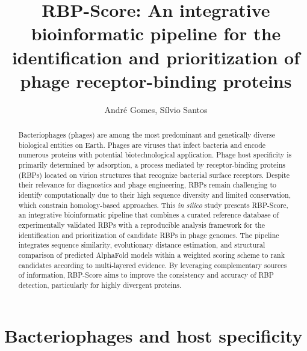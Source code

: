 \documentclass[runningheads]{llncs}
\begin{document}
\raggedbottom

\title{RBP-Score: An integrative bioinformatic pipeline for the identification and prioritization of phage receptor-binding proteins}

\author{Andr\'e Gomes, S\'ilvio Santos}


\maketitle

\begin{abstract}
Bacteriophages (phages) are among the most predominant and genetically diverse biological entities on Earth. Phages are viruses that infect bacteria and encode numerous proteins with potential biotechnological application. Phage host specificity is primarily determined by adsorption, a process mediated by receptor-binding proteins (RBPs) located on virion structures that recognize bacterial surface receptors. Despite their relevance for diagnostics and phage engineering, RBPs remain challenging to identify computationally due to their high sequence diversity and limited conservation, which constrain homology-based approaches. This \textit{in silico} study presents RBP-Score, an integrative bioinformatic pipeline that combines a curated reference database of experimentally validated RBPs with a reproducible analysis framework for the identification and prioritization of candidate RBPs in phage genomes. The pipeline integrates sequence similarity, evolutionary distance estimation, and structural comparison of predicted AlphaFold models within a weighted scoring scheme to rank candidates according to multi-layered evidence. By leveraging complementary sources of information, RBP-Score aims to improve the consistency and accuracy of RBP detection, particularly for highly divergent proteins.

\end{abstract}

\section{Bacteriophages and host specificity}
\end{document}
